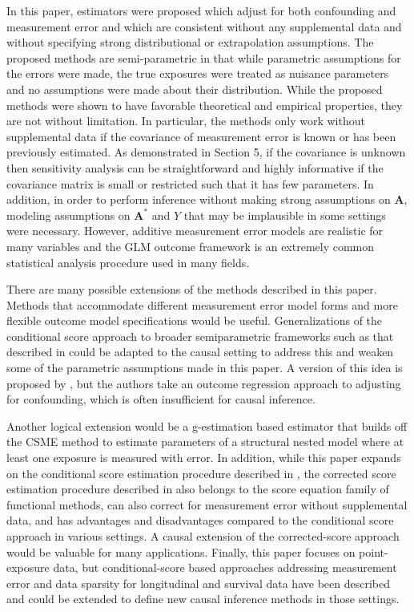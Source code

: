 \documentclass[useAMS,usenatbib,referee]{biom}
\begin{document}
In this paper, estimators were proposed which adjust for both confounding and measurement error and which are consistent without any supplemental data and without specifying strong distributional or extrapolation assumptions. The proposed methods are semi-parametric in that while parametric assumptions for the errors were made, the true exposures were treated as nuisance parameters and no assumptions were made about their distribution. While the proposed methods were shown to have favorable theoretical and empirical properties, they are not without limitation. In particular, the methods only work without supplemental data if the covariance of measurement error is known or has been previously estimated. As demonstrated in Section 5, if the covariance is unknown then sensitivity analysis can be straightforward and highly informative if the covariance matrix is small or restricted such that it has few parameters. In addition, in order to perform inference without making strong assumptions on $\bm{A}$, modeling assumptions on $\bm{A}^{*}$ and $Y$ that may be implausible in some settings were necessary. However, additive measurement error models are realistic for many variables and the GLM outcome framework is an extremely common statistical analysis procedure used in many fields.

There are many possible extensions of the methods described in this paper. Methods that accommodate different measurement error model forms and more flexible outcome model specifications would be useful. Generalizations of the conditional score approach to broader semiparametric frameworks such as that described in \citet{tsiatis2004} could be adapted to the causal setting to address this and weaken some of the parametric assumptions made in this paper. A version of this idea is proposed by \citet{liu2017}, but the authors take an outcome regression approach to adjusting for confounding, which is often insufficient for causal inference.

Another logical extension would be a g-estimation based estimator that builds off the CSME method to estimate parameters of a structural nested model where at least one exposure is measured with error. In addition, while this paper expands on the conditional score estimation procedure described in \citet{stefanski1987}, the corrected score estimation procedure described in \citet{nakamura1990} also belongs to the score equation family of functional methods, can also correct for measurement error without supplemental data, and has advantages and disadvantages compared to the conditional score approach in various settings. A causal extension of the corrected-score approach would be valuable for many applications. Finally, this paper focuses on point-exposure data, but conditional-score based approaches addressing measurement error and data sparsity for longitudinal and survival data have been described and could be extended to define new causal inference methods in those settings.
\end{document}
